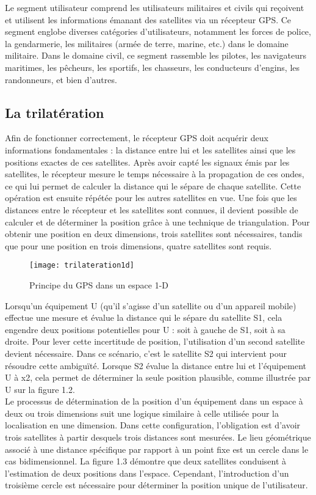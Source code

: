Le segment utilisateur comprend les utilisateurs militaires et civils qui reçoivent et utilisent les informations émanant des satellites via un récepteur GPS. Ce segment englobe diverses catégories d'utilisateurs, notamment les forces de police, la gendarmerie, les militaires (armée de terre, marine, etc.) dans le domaine militaire. Dans le domaine civil, ce segment rassemble les pilotes, les navigateurs maritimes, les pêcheurs, les sportifs, les chasseurs, les conducteurs d'engins, les randonneurs, et bien d'autres.

\subsection{La trilatération}

Afin de fonctionner correctement, le récepteur GPS doit acquérir deux informations fondamentales : la distance entre lui et les satellites ainsi que les positions exactes de ces satellites. Après avoir capté les signaux émis par les satellites, le récepteur mesure le temps nécessaire à la propagation de ces ondes, ce qui lui permet de calculer la distance qui le sépare de chaque satellite. Cette opération est ensuite répétée pour les autres satellites en vue.
Une fois que les distances entre le récepteur et les satellites sont connues, il devient possible de calculer et de déterminer la position grâce à une technique de triangulation. Pour obtenir une position en deux dimensions, trois satellites sont nécessaires, tandis que pour une position en trois dimensions, quatre satellites sont requis.

\begin{figure}[H]
	\texttt{[image: trilateration1d]}
	\caption{Principe du GPS dans un espace 1-D}
\end{figure}

Lorsqu'un équipement U (qu'il s'agisse d'un satellite ou d'un appareil mobile) effectue une mesure et évalue la distance qui le sépare du satellite S1, cela engendre deux positions potentielles pour U : soit à gauche de S1, soit à sa droite. Pour lever cette incertitude de position, l'utilisation d'un second satellite devient nécessaire. Dans ce scénario, c'est le satellite S2 qui intervient pour résoudre cette ambiguïté. Lorsque S2 évalue la distance entre lui et l'équipement U à x2, cela permet de déterminer la seule position plausible, comme illustrée par U sur la figure 1.2.\\

Le processus de détermination de la position d'un équipement dans un espace à deux ou trois dimensions suit une logique similaire à celle utilisée pour la localisation en une dimension. Dans cette configuration, l'obligation est d'avoir trois satellites à partir desquels trois distances sont mesurées. Le lieu géométrique associé à une distance spécifique par rapport à un point fixe est un cercle dans le cas bidimensionnel. La figure 1.3 démontre que deux satellites conduisent à l'estimation de deux positions dans l'espace. Cependant, l'introduction d'un troisième cercle est nécessaire pour déterminer la position unique de l'utilisateur.

